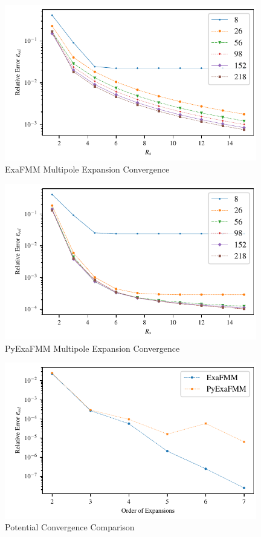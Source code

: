 \documentclass{IEEEcsmag}
\begin{document}
\begin{figure}
\centerline{\includegraphics[width=26pc]{figures/exafmm_multipole_convergence.pdf}}
\caption{ExaFMM Multipole Expansion Convergence}
\end{figure}
\begin{figure}
\centerline{\includegraphics[width=26pc]{figures/pyexafmm_multipole_convergence.pdf}}
\caption{PyExaFMM Multipole Expansion Convergence}
\end{figure}

\begin{figure}
\centerline{\includegraphics[width=26pc]{figures/potential_convergence.pdf}}
\caption{Potential Convergence Comparison}
\end{figure}
\end{document}
